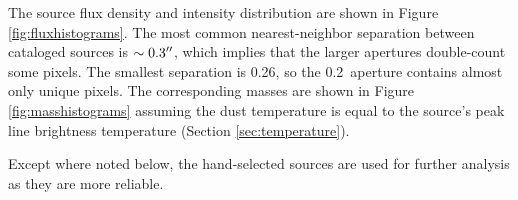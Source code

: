 \documentclass[twocolumn]{aastex61}
\begin{document}
The source flux density and intensity distribution are shown in Figure
\ref{fig:fluxhistograms}.  The most common nearest-neighbor separation between
cataloged sources is $\sim0.3\mbox{$^{\prime\prime}$}$, which implies that the larger apertures
double-count some pixels.  The smallest separation is 0.26\arcsec, so the
0.2\arcsec\ aperture contains almost only unique pixels.  The corresponding
masses are shown in Figure \ref{fig:masshistograms} assuming the dust
temperature is equal to the source's peak line brightness temperature (Section
\ref{sec:temperature}).


Except where noted below, the hand-selected sources are used for further
analysis as they are more reliable.




% 


\end{document}
